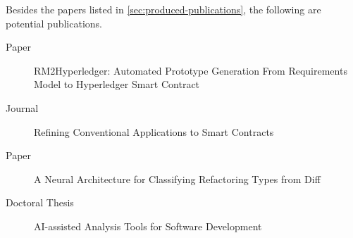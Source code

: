 Besides the papers listed in \autoref{sec:produced-publications}, the following are potential publications.

\begin{description}
\item[Paper] RM2Hyperledger: Automated Prototype Generation From Requirements Model to Hyperledger Smart Contract
\item[Journal] Refining Conventional Applications to Smart Contracts
\item[Paper] A Neural Architecture for Classifying Refactoring Types from Diff
\item[Doctoral Thesis] AI-assisted Analysis Tools for Software Development
\end{description}



